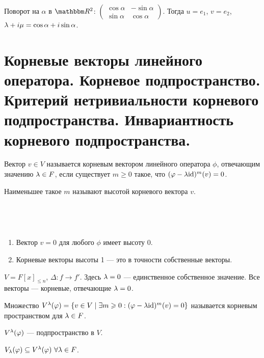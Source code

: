 \begin{Examples}
Поворот на $\alpha$ в $\R^2$: $
\begin{pmatrix}
\cos \alpha & -\sin \alpha \\
\sin \alpha & \cos \alpha  
\end{pmatrix}
$. Тогда $u = e_1$, $v = e_2$, $\lambda + i\mu = \cos \alpha + i\sin \alpha$.
\end{Examples}

\section{Корневые векторы линейного оператора. Корневое подпространство. Критерий нетривиальности корневого подпространства. Инвариантность корневого подпространства.}

\begin{Def}
Вектор $v \in V$ называется корневым вектором линейного оператора $\phi$, отвечающим значению $\lambda \in F$, если существует $m \geqslant 0$ такое, что $(\varphi - \lambda\mathrm{id})^m(v) = 0$.

Наименьшее такое $m$ называют высотой корневого вектора $v$.
\end{Def}
\ \\
\begin{Comment}\
\begin{enumerate}
\item Вектор $v = 0$ для любого $\phi$ имеет высоту 0.
\item Корневые векторы высоты 1 --- это в точности собственные векторы.
\end{enumerate}
\end{Comment}

\begin{Examples}
$V = F[x]_{\leqslant n}$, $\Delta: f \rightarrow f'$. Здесь $\lambda = 0$ --- единственное собственное значение. Все векторы --- корневые, отвечающие $\lambda = 0$. 
\end{Examples}

\begin{Def}
Множество $V^\lambda(\varphi) = \{ v \in V \mid \exists m \geqslant 0  : (\varphi - \lambda\mathrm{id})^m(v) = 0 \}$ называется корневым пространством для $\lambda \in F$.
\end{Def}

\begin{Task}
$V^\lambda(\varphi)$ --- подпространство в $V$.
\end{Task}

\begin{Comment}
$V_\lambda(\varphi) \subseteq V^\lambda(\varphi) \ \forall \lambda \in F$.
\end{Comment}

